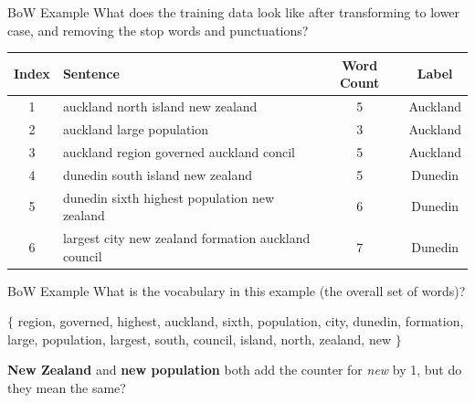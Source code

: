 \documentclass[aspectratio=169, 10pt]{beamer}
\begin{document}
\begin{frame}{BoW Example}
    What does the training data look like after  transforming to lower case, and removing the stop words and punctuations?
    \pause

    \begin{table}[]
        \small
        \begin{tabular}{c|l|c|c}
        \textbf{Index} & \textbf{Sentence}                                   & \textbf{Word Count} & \textbf{Label} \\ \hline
        1              & auckland north island new zealand                   & 5                   & Auckland       \\
        2              & auckland large population                           & 3                   & Auckland       \\
        3              & auckland region governed auckland concil            & 5                   & Auckland       \\
        4              & dunedin south island new zealand                    & 5                   & Dunedin        \\
        5              & dunedin sixth highest population new zealand        & 6                   & Dunedin        \\
        6              & largest city new zealand formation auckland council & 7                   & Dunedin       
        \end{tabular}
    \end{table}

\end{frame}

\begin{frame}{BoW Example}
    What is the vocabulary in this example (the overall set of words)?\\
    \vspace{1em}
    
    $\{$ region, governed, highest, auckland, sixth, population, city, dunedin, formation, large, population, largest, south, council, island, north, zealand, new $\}$\\
    \vspace{1em}

    \textbf{New Zealand} and \textbf{new population} both add the counter for \textit{new} by 1, but do they mean the same?
\end{frame}
\end{document}
